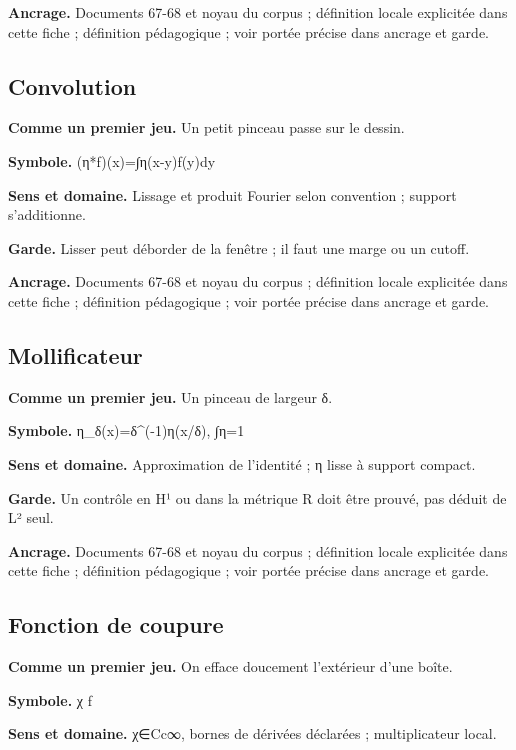 \documentclass[
  9pt,
  a4paper,
]{article}
\begin{document}
\textbf{Ancrage.} Documents 67-68 et noyau du corpus ; définition locale
explicitée dans cette fiche ; définition pédagogique ; voir portée
précise dans ancrage et garde.

\hypertarget{convolution}{%
\subsection{Convolution}\label{convolution}}

\textbf{Comme un premier jeu.} Un petit pinceau passe sur le dessin.

\textbf{Symbole.} (η*f)(x)=∫η(x-y)f(y)dy

\textbf{Sens et domaine.} Lissage et produit Fourier selon convention ;
support s'additionne.

\textbf{Garde.} Lisser peut déborder de la fenêtre ; il faut une marge
ou un cutoff.

\textbf{Ancrage.} Documents 67-68 et noyau du corpus ; définition locale
explicitée dans cette fiche ; définition pédagogique ; voir portée
précise dans ancrage et garde.

\hypertarget{mollificateur}{%
\subsection{Mollificateur}\label{mollificateur}}

\textbf{Comme un premier jeu.} Un pinceau de largeur δ.

\textbf{Symbole.} η\_δ(x)=δ\^{}(-1)η(x/δ), ∫η=1

\textbf{Sens et domaine.} Approximation de l'identité ; η lisse à
support compact.

\textbf{Garde.} Un contrôle en H¹ ou dans la métrique R doit être
prouvé, pas déduit de L² seul.

\textbf{Ancrage.} Documents 67-68 et noyau du corpus ; définition locale
explicitée dans cette fiche ; définition pédagogique ; voir portée
précise dans ancrage et garde.

\hypertarget{fonction-de-coupure}{%
\subsection{Fonction de coupure}\label{fonction-de-coupure}}

\textbf{Comme un premier jeu.} On efface doucement l'extérieur d'une
boîte.

\textbf{Symbole.} χ f

\textbf{Sens et domaine.} χ∈Cc∞, bornes de dérivées déclarées ;
multiplicateur local.
\end{document}
